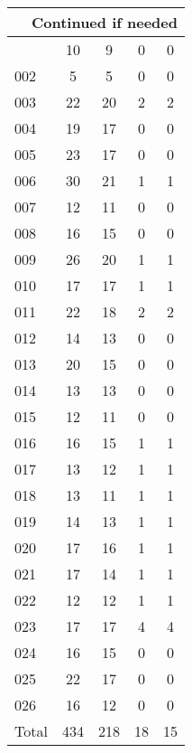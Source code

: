 \begin{center}
\begin{longtable}{l|c|c|c|c}
\hline \multicolumn{5}{|r|}{{Continued if needed}} \\ \hline
\endfoot 
001 & 10 & 9 & 0 & 0\\ \hline
002 & 5 & 5 & 0 & 0\\ \hline
003 & 22 & 20 & 2 & 2\\ \hline
004 & 19 & 17 & 0 & 0\\ \hline
005 & 23 & 17 & 0 & 0\\ \hline
006 & 30 & 21 & 1 & 1\\ \hline
007 & 12 & 11 & 0 & 0\\ \hline
008 & 16 & 15 & 0 & 0\\ \hline
009 & 26 & 20 & 1 & 1\\ \hline
010 & 17 & 17 & 1 & 1\\ \hline
011 & 22 & 18 & 2 & 2\\ \hline
012 & 14 & 13 & 0 & 0\\ \hline
013 & 20 & 15 & 0 & 0\\ \hline
014 & 13 & 13 & 0 & 0\\ \hline
015 & 12 & 11 & 0 & 0\\ \hline
016 & 16 & 15 & 1 & 1\\ \hline
017 & 13 & 12 & 1 & 1\\ \hline
018 & 13 & 11 & 1 & 1\\ \hline
019 & 14 & 13 & 1 & 1\\ \hline
020 & 17 & 16 & 1 & 1\\ \hline
021 & 17 & 14 & 1 & 1\\ \hline
022 & 12 & 12 & 1 & 1\\ \hline
023 & 17 & 17 & 4 & 4\\ \hline
024 & 16 & 15 & 0 & 0\\ \hline
025 & 22 & 17 & 0 & 0\\ \hline
026 & 16 & 12 & 0 & 0\\ \hline
\hline \hline
Total & 434 & 218 & 18 & 15



\end{longtable}
\end{center}
 
 



\scriptsize



